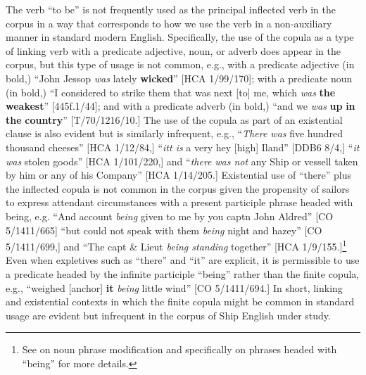 The verb “to be” is not frequently used as the principal inflected verb in the corpus in a way that corresponds to how we use the verb in a non-auxiliary manner in standard modern English. Specifically, the use of the copula as a type of linking verb with a predicate adjective, noun, or adverb does appear in the corpus, but this type of usage is not common, e.g., with a predicate adjective (in bold,) “John Jessop \textit{was} lately \textbf{wicked}” [HCA 1/99/170]; with a predicate noun (in bold,) “I considered to strike them that was next [to] me, which \textit{was} \textbf{the} \textbf{weakest}” [445f.1/44]; and with a predicate adverb (in bold,) “and we \textit{was} \textbf{up} \textbf{in} \textbf{the} \textbf{country}” [T/70/1216/10.] The use of the copula as part of an existential clause is also evident but is similarly infrequent, e.g., “\textit{There was} five hundred thousand cheeses” [HCA 1/12/84,] “\textit{itt is} a very hey [high] Iland” [DDB6 8/4,] “\textit{it was} stolen goods” [HCA 1/101/220,] and “\textit{there} \textit{was not} any Ship or vessell taken by him or any of his Company” [HCA 1/14/205.] Existential use of “there” plus the inflected copula is not common in the corpus given the propensity of sailors to express attendant circumstances with a present participle phrase headed with being, e.g. “And account \textit{being} given to me by you captn John Aldred” [CO 5/1411/665] “but could not speak with them \textit{being} night and hazey” [CO 5/1411/699,] and “The capt \& Lieut \textit{being standing} together” [HCA 1/9/155.]\footnote{See  on noun phrase modification and specifically  on phrases headed with “being” for more details.} Even when expletives such as “there” and “it” are explicit, it is permissible to use a predicate headed by the infinite participle “being” rather than the finite copula, e.g., “weighed [anchor] \textbf{it} \textit{being} little wind” [CO 5/1411/694.] In short, linking and existential contexts in which the finite copula might be common in standard usage are evident but infrequent in the corpus of Ship English under study. 

